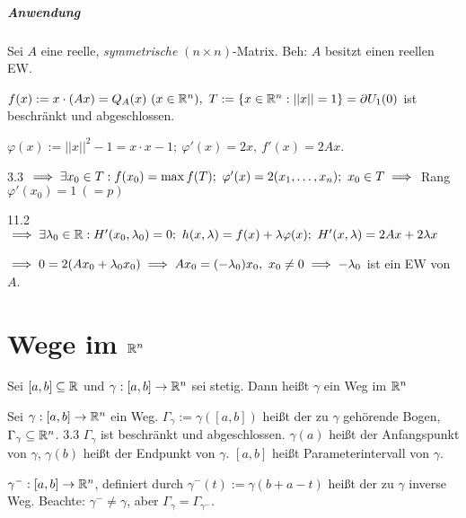 \documentclass[a4paper,twoside,DIV15,BCOR12mm,chapterprefix=true,headings=twolinechapter]{scrbook}
\begin{document}
\paragraph{Anwendung}
Sei $A$ eine reelle, \emph{symmetrische} $(n\times n)$-Matrix. Beh: $A$ besitzt einen reellen EW.

\begin{beweis}
$f(x) := x\cdot(Ax) = Q_A(x)\ (x \in \mathbb{R}^n),\ T:= \{x \in \mathbb{R}^n: ||x||=1\} = \partial U_1(0)$ ist beschränkt und abgeschlossen.

$\varphi(x) := ||x||^2-1 = x\cdot x-1;\ \varphi'(x) = 2x,\ f'(x) = 2Ax$.

3.3 $\implies \exists x_0 \in T: f(x_0) = \max f(T);\ \varphi'(x) = 2(x_1,\ldots,x_n);\ x_0 \in T \implies$ Rang $\varphi'(x_0) = 1\ (=p)$

11.2 $\folgt \exists \lambda_0 \in \MdR: H'(x_0,\lambda_0) = 0;\ h(x,\lambda) = f(x)+\lambda\varphi(x);\ H'(x,\lambda) = 2Ax+2\lambda x$

$\implies 0 = 2(Ax_0+\lambda_0 x_0) \implies Ax_0 = (-\lambda_0) x_0,\ x_0 \ne 0 \implies -\lambda_0$ ist ein EW von $A$.
\end{beweis}
\chapter{Wege im $\mathbb{R}^n$}
 
\begin{definition}
\begin{liste}
\item Sei $[a,b]\subseteq \mathbb{R}$ und $\gamma: [a,b] \to \mathbb{R}^n$ sei stetig. Dann heißt $\gamma$ ein Weg im $\mathbb{R}^n$
\item Sei $\gamma :[a,b] \to \mathbb{R}^n$ ein Weg. $\Gamma_\gamma := \gamma([a,b])$ heißt der zu $\gamma$ gehörende Bogen, $\Gamma_\gamma \subseteq \mathbb{R}^n$. 3.3 \folgt{} $\Gamma_\gamma$ ist beschränkt und abgeschlossen. $\gamma(a)$ heißt der Anfangspunkt von $\gamma$, $\gamma(b)$ heißt der Endpunkt von $\gamma$. $[a,b]$ heißt Parameterintervall von $\gamma$.
\item $\gamma^-:[a,b]\to \mathbb{R}^n$, definiert durch $\gamma^-(t):=\gamma(b+a-t)$ heißt der zu $\gamma$ inverse Weg. Beachte: $\gamma^- \ne \gamma$, aber $\Gamma_\gamma = \Gamma_{\gamma^-}$.
\end{liste}
\end{definition}
\end{document}
